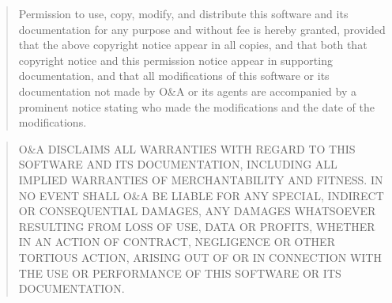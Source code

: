 


\smallskip
{\bf 
{
\smallskip

\begin{quote}
Permission to use, copy, modify, and distribute this software and its
documentation for any purpose and without fee is hereby granted,
provided that the above copyright notice appear in all copies, and
that both that copyright notice and this permission notice appear in
supporting documentation, and that all modifications of this software
or its documentation not made by O\&A or its agents are accompanied
by a prominent notice stating who made the modifications and the date
of the modifications.
\end{quote}
\smallskip
}
}

{\em
\begin{quote}
O\&A DISCLAIMS ALL WARRANTIES WITH REGARD TO THIS SOFTWARE AND ITS
DOCUMENTATION, INCLUDING ALL IMPLIED WARRANTIES OF MERCHANTABILITY AND
FITNESS.  IN NO EVENT SHALL O\&A BE LIABLE FOR ANY SPECIAL, INDIRECT OR
CONSEQUENTIAL DAMAGES, ANY DAMAGES WHATSOEVER RESULTING FROM LOSS OF
USE, DATA OR PROFITS, WHETHER IN AN ACTION OF CONTRACT, NEGLIGENCE OR
OTHER TORTIOUS ACTION, ARISING OUT OF OR IN CONNECTION WITH THE USE OR
PERFORMANCE OF THIS SOFTWARE OR ITS DOCUMENTATION.
\end{quote}
}






